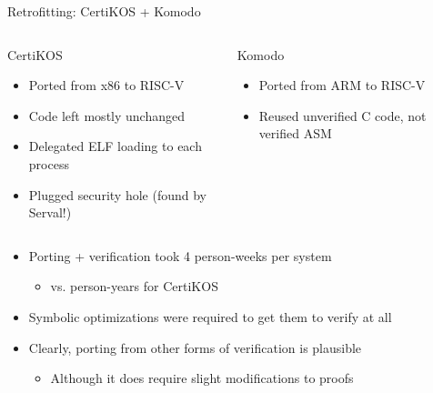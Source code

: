 \documentclass[10pt,aspectratio=169]{beamer}
\newcommand{\twostack}[2]{
#1


\vfill\null


#2
}
\begin{document}
\begin{frame}{Retrofitting: CertiKOS + Komodo}
\twostack{

\begin{columns}[T]
\begin{block}{CertiKOS}
\begin{itemize}
    \item Ported from x86 to RISC-V
    \item Code left mostly unchanged
    \item Delegated ELF loading to each process
    \item Plugged security hole (found by Serval!)
\end{itemize}
\end{block}

\column{0.5\textwidth}
\begin{block}{Komodo}
\begin{itemize}
\item Ported from ARM to RISC-V
\item Reused unverified C code, not verified ASM
\end{itemize}
\end{block}
\end{columns}

}{

\begin{itemize}
    \item {Porting + verification took 4 person-weeks per system}
    \begin{itemize}
        \item {vs. person-years for CertiKOS}
        \end{itemize}
    \item {Symbolic optimizations were required to get them to verify at all}
    \item {Clearly, porting from other forms of verification is plausible}
    \begin{itemize}
        \item Although it does require slight modifications to proofs
    \end{itemize}
\end{itemize}

}

\end{frame}
\end{document}
